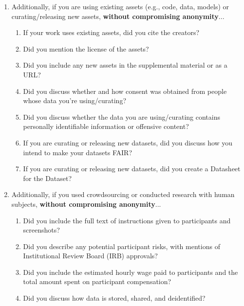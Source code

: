 \begin{enumerate}
\begin{enumerate}
\end{enumerate}

\item Additionally, if you are using existing assets (e.g., code, data, models) or curating/releasing new assets, \textbf{without compromising anonymity}...
\begin{enumerate}
  \item If your work uses existing assets, did you cite the creators?
  \item Did you mention the license of the assets?
  \item Did you include any new assets in the supplemental material or as a URL?
  \item Did you discuss whether and how consent was obtained from people whose data you're using/curating?
  \item Did you discuss whether the data you are using/curating contains personally identifiable information or offensive content?
\item If you are curating or releasing new datasets, did you discuss how you intend to make your datasets FAIR?
\item If you are curating or releasing new datasets, did you create a Datasheet for the Dataset? 
\end{enumerate}

\item Additionally, if you used crowdsourcing or conducted research with human subjects, \textbf{without compromising anonymity}...
\begin{enumerate}
  \item Did you include the full text of instructions given to participants and screenshots?
  \item Did you describe any potential participant risks, with mentions of Institutional Review Board (IRB) approvals?
  \item Did you include the estimated hourly wage paid to participants and the total amount spent on participant compensation?
   \item Did you discuss how data is stored, shared, and deidentified?
\end{enumerate}

\end{enumerate}
